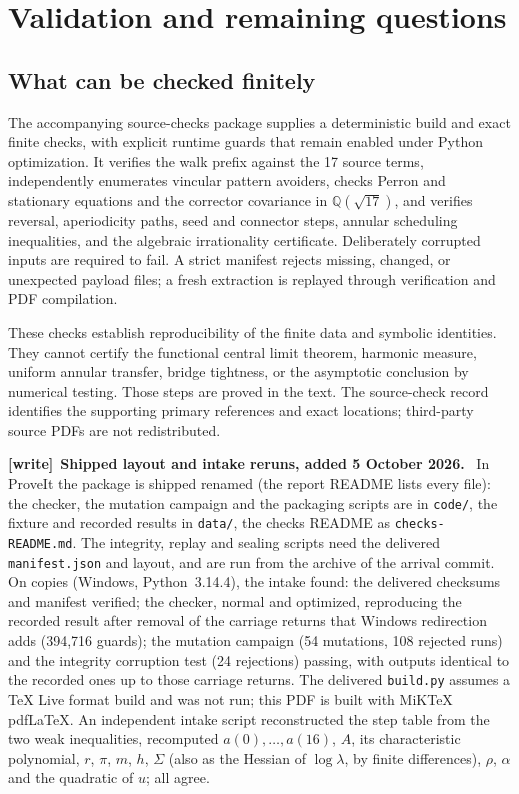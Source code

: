 \documentclass[11pt,letterpaper]{article}
\newcommand{\Q}{\mathbb Q}\newcommand{\R}{\mathbb R}\newcommand{\Z}{\mathbb Z}
\numberwithin{equation}{section}
\newenvironment{writenote}[1][]{\par\smallskip\begingroup\small
 \noindent\textbf{[write]}\if\relax\detokenize{#1}\relax\else~\textbf{#1.}\fi\ }%
 {\par\endgroup\smallskip}
\begin{document}
\section{Validation and remaining questions}\label{osr:sec:validation}
\subsection{What can be checked finitely}
The accompanying source-checks package supplies a deterministic build and exact finite checks, with explicit runtime guards that remain enabled under Python optimization. It verifies the walk prefix against the 17 source terms, independently enumerates vincular pattern avoiders, checks Perron and stationary equations and the corrector covariance in $\Q(\sqrt{17})$, and verifies reversal, aperiodicity paths, seed and connector steps, annular scheduling inequalities, and the algebraic irrationality certificate. Deliberately corrupted inputs are required to fail. A strict manifest rejects missing, changed, or unexpected payload files; a fresh extraction is replayed through verification and PDF compilation.

These checks establish reproducibility of the finite data and symbolic identities. They cannot certify the functional central limit theorem, harmonic measure, uniform annular transfer, bridge tightness, or the asymptotic conclusion by numerical testing. Those steps are proved in the text. The source-check record identifies the supporting primary references and exact locations; third-party source PDFs are not redistributed.

\begin{writenote}[Shipped layout and intake reruns, added 5 October 2026]
In ProveIt the package is shipped renamed (the report README lists every
file): the checker, the mutation campaign and the packaging scripts are in
\nolinkurl{code/}, the fixture and recorded results in \nolinkurl{data/},
the checks README as \nolinkurl{checks-README.md}. The integrity, replay and
sealing scripts need the delivered \nolinkurl{manifest.json} and layout, and
are run from the archive of the arrival commit. On copies (Windows,
Python~3.14.4), the intake found: the delivered checksums and manifest
verified; the checker, normal and optimized, reproducing the recorded
result after removal of the carriage returns that Windows redirection adds
(394{,}716 guards); the mutation campaign (54 mutations, 108 rejected runs)
and the integrity corruption test (24 rejections) passing, with outputs
identical to the recorded ones up to those carriage returns. The delivered
\nolinkurl{build.py} assumes a TeX Live format build and was not run; this
PDF is built with MiKTeX pdf\LaTeX. An independent intake script
reconstructed the step table from the two weak inequalities, recomputed
$a(0),\dots,a(16)$, $A$, its characteristic polynomial, $r$, $\pi$, $m$,
$h$, $\Sigma$ (also as the Hessian of $\log\lambda$, by finite
differences), $\rho$, $\alpha$ and the quadratic of $u$; all agree.
\end{writenote}
\end{document}
